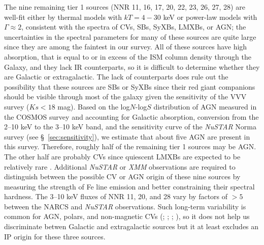 \documentclass[iop,revtex4]{emulateapj}
\begin{document}

The nine remaining tier 1 sources (NNR 11, 16, 17, 20, 22, 23, 26, 27, 28) are well-fit either by thermal models with $kT=4-30$ keV or power-law models with $\Gamma\approx2$, consistent with the spectra of CVs, SBs, SyXBs, LMXBs, or AGN; the uncertainties in the spectral parameters for many of these sources are quite large since they are among the faintest in our survey.  All of these sources have high absorption, that is equal to or in excess of the ISM column density through the Galaxy, and they lack IR counterparts, so it is difficult to determine whether they are Galactic or extragalactic.  The lack of counterparts does rule out the possibility that these sources are SBs or SyXBs since their red giant companions should be visible through most of the galaxy given the sensitivity of the VVV survey ($Ks<18$ mag).  Based on the log$N$-log$S$ distribution of AGN measured in the COSMOS survey \citep{cappelluti09} and accounting for Galactic absorption, conversion from the 2--10 keV to the 3--10 keV band, and the sensitivity curve of the \textit{NuSTAR} Norma survey (see \S~\ref{sec:sensitivity}), we estimate that about five AGN are present in this survey.  Therefore, roughly half of the remaining tier 1 sources may be AGN.  The other half are probably CVs since quiescent LMXBs are expected to be relatively rare \citep{tanaka96}.  Additional \textit{NuSTAR} or \textit{XMM} observations are required to distinguish between the possible CV or AGN origin of these nine sources by measuring the strength of Fe line emission and better constraining their spectral hardness.  The 3--10 keV fluxes of NNR 11, 20, and 28 vary by factors of $>5$ between the NARCS and \textit{NuSTAR} observations.  Such long-term variability is common for AGN, polars, and non-magnetic CVs (\citealt{orio01}; \citealt{markowitz04}; \citealt{ramsay04}; \citealt{baskill05}), so it does not help us discriminate betwen Galactic and extragalactic sources but it at least excludes an IP origin for these three sources.\par
\end{document}
